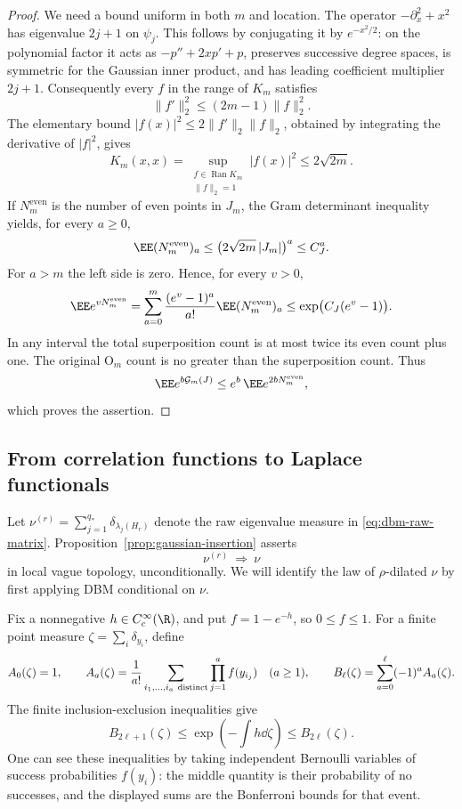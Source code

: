 \begin{proof}
We need a bound uniform in both \(m\) and location.
The operator \(-\partial_x^2+x^2\) has eigenvalue \(2j+1\) on
\(\psi_j\). This follows by conjugating it by \(e^{-x^2/2}\):
on the polynomial factor it acts as
\(-p''+2xp'+p\), preserves successive degree spaces, is symmetric
for the Gaussian inner product, and has leading coefficient
multiplier \(2j+1\).
Consequently every \(f\) in the range of \(K_m\) satisfies
\[
 \|f'\|_2^2\le(2m-1)\|f\|_2^2.
\]
The elementary bound
\(|f(x)|^2\le2\|f'\|_2\|f\|_2\), obtained by integrating the
derivative of \(|f|^2\), gives
\[
 K_m(x,x)
   =\sup_{\substack{f\in\operatorname{Ran}K_m\\\|f\|_2=1}}
       |f(x)|^2
   \le2\sqrt{2m}.
\]
If \(N_m^{\mathrm{even}}\) is the number of even points in \(J_m\),
the Gram determinant inequality yields, for every \(a\ge0\),
\[
 \EE(N_m^{\mathrm{even}})_a
   \le \bigl(2\sqrt{2m}\,|J_m|\bigr)^a\le C_J^a.
\]
For \(a>m\) the left side is zero. Hence, for every \(v>0\),
\[
 \EE e^{vN_m^{\mathrm{even}}}
   =\sum_{a=0}^m
       \frac{(e^v-1)^a}{a!}\EE(N_m^{\mathrm{even}})_a
   \le\exp\bigl(C_J(e^v-1)\bigr).
\]
In any interval the total superposition count is at most twice
its even count plus one. The original \(\mathrm O_m\) count is
no greater than the superposition count. Thus
\[
 \EE e^{b\mathcal G_m(J)}
   \le e^b\,\EE e^{2bN_m^{\mathrm{even}}},
\]
which proves the assertion.
\end{proof}

\subsection{From correlation functions to Laplace functionals}

Let \(\nu^{(r)}=\sum_{j=1}^{q_*}\delta_{\lambda_j(H_r)}\) denote
the raw eigenvalue measure in \eqref{eq:dbm-raw-matrix}.
Proposition~\ref{prop:gaussian-insertion} asserts
\begin{equation}
 \label{eq:dbm-insertion-limit}
 \nu^{(r)}\ \Longrightarrow\ \nu
\end{equation}
in local vague topology, unconditionally. We will identify the law
of \(\rho\)-dilated \(\nu\) by first applying DBM conditional on \(\nu\).

Fix a nonnegative \(h\in C_c^\infty(\R)\), and put
\(f=1-e^{-h}\), so \(0\le f\le1\). For a finite point measure
\(\zeta=\sum_i\delta_{y_i}\), define
\[
 A_0(\zeta)=1,\qquad
 A_a(\zeta)=\frac1{a!}
    \sum_{i_1,\ldots,i_a\ {\rm distinct}}
        \prod_{j=1}^a f(y_{i_j})\quad(a\ge1),
 \qquad
 B_\ell(\zeta)=\sum_{a=0}^{\ell}(-1)^aA_a(\zeta).
\]
The finite inclusion-exclusion inequalities give
\begin{equation}
 \label{eq:dbm-bonferroni}
 B_{2\ell+1}(\zeta)
   \le \exp\left(-\int h\dd\zeta\right)
   \le B_{2\ell}(\zeta).
\end{equation}
One can see these inequalities by taking independent Bernoulli
variables of success probabilities \(f(y_i)\): the middle quantity
is their probability of no successes, and the displayed sums are
the Bonferroni bounds for that event.


